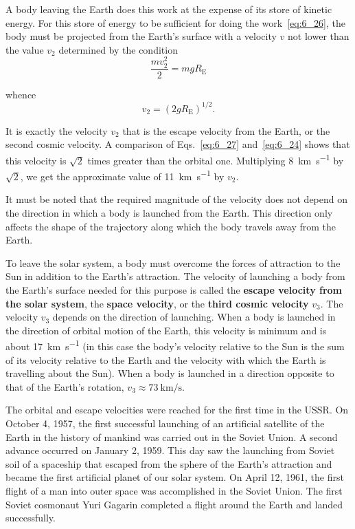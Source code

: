 A body leaving the Earth does this work at the expense of its store of kinetic energy. For this store of energy to be sufficient for doing the work~\eqref{eq:6_26}, the body must be projected from the Earth's surface with a velocity $v$ not lower than the value $v_2$ determined by the condition
\begin{equation*}
	\frac{mv_2^2}{2} = mgR_{\text{E}}
\end{equation*}

\noindent
whence
\begin{equation}\label{eq:6_27}
	v_2 = (2gR_{\text{E}})^{1/2}.
\end{equation}

\noindent
It is exactly the velocity $v_2$ that is the escape velocity from the Earth, or the second cosmic velocity. A comparison of Eqs.~\eqref{eq:6_27} and~\eqref{eq:6_24} shows that this velocity is $\sqrt{2}$ times greater than the orbital one. Multiplying \SI{8}{\kilo\metre\per\second} by $\sqrt{2}$, we get the approximate value of \SI{11}{\kilo\metre\per\second} by $v_2$.

It must be noted that the required magnitude of the velocity does not depend on the direction in which a body is launched from the Earth. This direction only affects the shape of the trajectory along which the body travels away from the Earth.

To leave the solar system, a body must overcome the forces of attraction to the Sun in addition to the Earth's attraction. The velocity of launching a body from the Earth's surface needed for this purpose is called the \textbf{escape velocity from the solar system}, the \textbf{space velocity}, or the \textbf{third cosmic velocity} $v_3$. The velocity $v_3$ depends on the direction of launching. When a body is launched in the direction of orbital motion of the Earth, this velocity is minimum and is about \SI{17}{\kilo\metre\per\second} (in this case the body's velocity relative to the Sun is the sum of its velocity relative to the Earth and the velocity with which the Earth is travelling about the Sun). When a body is launched in a direction opposite to that of the Earth's rotation, $v_3\approx \SI{73}{\kilo\metre\per\second}$.

The orbital and escape velocities were reached for the first time in the USSR. On October 4, 1957, the first successful launching of an artificial satellite of the Earth in the history of mankind was carried out in the Soviet Union. A second advance occurred on January 2, 1959. This day saw the launching from Soviet soil of a spaceship that escaped from the sphere of the Earth's attraction and became the first artificial planet of our solar system. On April 12, 1961, the first flight of a man into outer space was accomplished in the Soviet Union. The first Soviet cosmonaut Yuri Gagarin completed a flight around the Earth and landed successfully.
